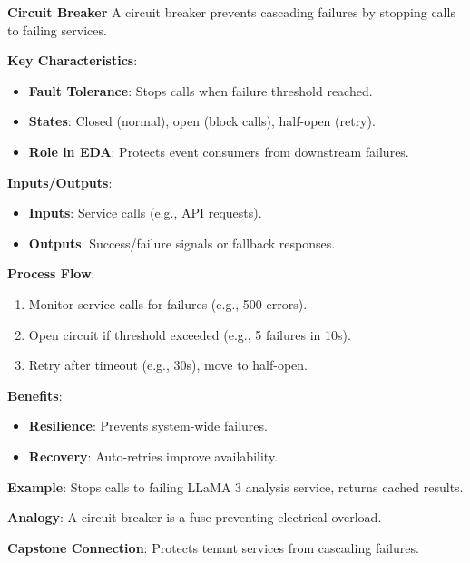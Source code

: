 \documentclass[11pt]{article}
\begin{document}
\begin{glossaryterm}
\textbf{Circuit Breaker}\newline
A circuit breaker prevents cascading failures by stopping calls to failing services.

\textbf{Key Characteristics}:
\begin{itemize}
    \item \textbf{Fault Tolerance}: Stops calls when failure threshold reached.
    \item \textbf{States}: Closed (normal), open (block calls), half-open (retry).
    \item \textbf{Role in EDA}: Protects event consumers from downstream failures.
\end{itemize}

\textbf{Inputs/Outputs}:
\begin{itemize}
    \item \textbf{Inputs}: Service calls (e.g., API requests).
    \item \textbf{Outputs}: Success/failure signals or fallback responses.
\end{itemize}

\textbf{Process Flow}:
\begin{enumerate}
    \item Monitor service calls for failures (e.g., 500 errors).
    \item Open circuit if threshold exceeded (e.g., 5 failures in 10s).
    \item Retry after timeout (e.g., 30s), move to half-open.
\end{enumerate}

\textbf{Benefits}:
\begin{itemize}
    \item \textbf{Resilience}: Prevents system-wide failures.
    \item \textbf{Recovery}: Auto-retries improve availability.
\end{itemize}

\textbf{Example}: Stops calls to failing LLaMA 3 analysis service, returns cached results.

\textbf{Analogy}: A circuit breaker is a fuse preventing electrical overload.

\textbf{Capstone Connection}: Protects tenant services from cascading failures.
\end{glossaryterm}
\end{document}

